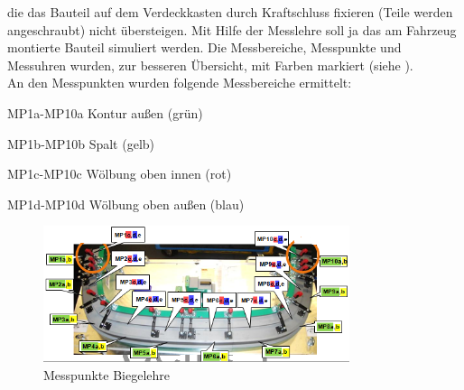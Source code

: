 \documentclass[12pt,a4paper,parskip]{scrartcl}
\begin{document}
 
  die das Bauteil auf dem Verdeckkasten durch Kraftschluss fixieren (Teile werden angeschraubt) nicht übersteigen. Mit Hilfe der Messlehre soll ja das am Fahrzeug montierte Bauteil simuliert werden.  Die Messbereiche, Messpunkte und Messuhren wurden, zur besseren Übersicht, mit Farben markiert (siehe ).  \\
 An den Messpunkten wurden folgende Messbereiche ermittelt:
 \begin{description*}
 \item[MP1a-MP10a] Kontur außen (grün)
 \item[MP1b-MP10b] Spalt (gelb)
 \item[MP1c-MP10c] Wölbung oben innen (rot)
 \item[MP1d-MP10d] Wölbung oben außen (blau)
 \end{description*}
\begin{figure}[hbtp]
\centering
\includegraphics[width=0.8\textwidth]{messpunktevdkda3}
\caption{Messpunkte Biegelehre}
\label{fig:messpunktevdkda3}
\end{figure} 
 
 
 
\end{document}
